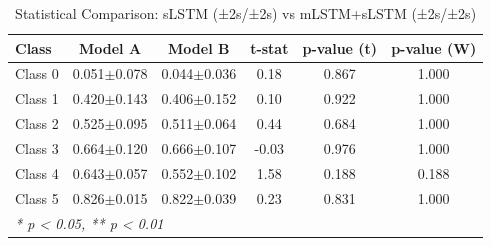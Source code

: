 \begin{table}[htbp]
\centering
\caption{Statistical Comparison: sLSTM (±2s/±2s) vs mLSTM+sLSTM (±2s/±2s)}
\label{tab:comparison_class_slstm_±2s_±2s_vs_mlstmslstm_±2s_±2s}
\begin{tabular}{lccccc}
\toprule
\textbf{Class} & \textbf{Model A} & \textbf{Model B} & \textbf{t-stat} & \textbf{p-value (t)} & \textbf{p-value (W)} \\
\midrule
Class 0 & 0.051$\pm$0.078 & 0.044$\pm$0.036 & 0.18 & 0.867 & 1.000 \\
Class 1 & 0.420$\pm$0.143 & 0.406$\pm$0.152 & 0.10 & 0.922 & 1.000 \\
Class 2 & 0.525$\pm$0.095 & 0.511$\pm$0.064 & 0.44 & 0.684 & 1.000 \\
Class 3 & 0.664$\pm$0.120 & 0.666$\pm$0.107 & -0.03 & 0.976 & 1.000 \\
Class 4 & 0.643$\pm$0.057 & 0.552$\pm$0.102 & 1.58 & 0.188 & 0.188 \\
Class 5 & 0.826$\pm$0.015 & 0.822$\pm$0.039 & 0.23 & 0.831 & 1.000 \\
\bottomrule
\multicolumn{6}{l}{\textit{* p < 0.05, ** p < 0.01}} \\
\end{tabular}
\end{table}
